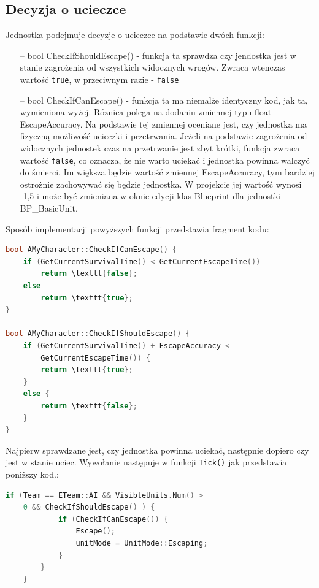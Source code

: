 \documentclass[12pt]{report}
\begin{document}
\subsection{Decyzja o ucieczce}

Jednostka podejmuje decyzje o ucieczce na podstawie dwóch funkcji: 
\begin{itemize}
\item[--] bool CheckIfShouldEscape() - funkcja ta sprawdza czy jendostka jest w stanie zagrożenia od wszystkich widocznych wrogów. Zwraca wtenczas wartość \texttt{true}, w przeciwnym razie - \texttt{false}
\item[--] bool CheckIfCanEscape() - funkcja ta ma niemalże identyczny kod, jak ta, wymieniona wyżej. Róznica polega na dodaniu zmiennej typu float - EscapeAccuracy. Na podstawie tej zmiennej oceniane jest, czy jednostka ma fizyczną możliwość ucieczki i przetrwania. Jeżeli na podstawie zagrożenia od widocznych jednostek czas na przetrwanie jest zbyt krótki, funkcja zwraca wartość \texttt{false}, co oznacza, że nie warto uciekać i jednostka powinna walczyć do śmierci. Im większa będzie wartość zmiennej EscapeAccuracy, tym bardziej ostrożnie zachowywać się będzie jednostka. W projekcie jej wartość wynosi -1,5 i może być zmieniana w oknie edycji klas Blueprint dla jednostki BP\_BasicUnit.
\end{itemize}

Sposób implementacji powyższych funkcji przedstawia fragment kodu:

\begin{lstlisting}[language=C++, backgroundcolor=\color{black!5}, basicstyle=\footnotesize, caption=Funkcje CheckIfShouldEscape i CheckIfCanEscape w klasie \texttt{AMyCharacter.cpp}.]
bool AMyCharacter::CheckIfCanEscape() {
	if (GetCurrentSurvivalTime() < GetCurrentEscapeTime())
		return \texttt{false};
	else
		return \texttt{true};
}

bool AMyCharacter::CheckIfShouldEscape() {
	if (GetCurrentSurvivalTime() + EscapeAccuracy < 
	    GetCurrentEscapeTime()) {
		return \texttt{true};
	}
	else {
		return \texttt{false};
	}
}
\end{lstlisting}

Najpierw sprawdzane jest, czy jednostka powinna uciekać, następnie dopiero czy jest w stanie uciec. Wywołanie następuje w funkcji \texttt{\texttt{Tick}()} jak przedstawia poniższy kod.:

\begin{lstlisting}[language=C++, backgroundcolor=\color{black!5}, basicstyle=\footnotesize, caption=Wywołanie funkcji CheckIfShouldEscape i CheckIfCanEscape w funkcji \texttt{\texttt{Tick}()} klasy AMyCharacter.]
if (Team == ETeam::AI && VisibleUnits.Num() > 
    0 && CheckIfShouldEscape() ) {
			if (CheckIfCanEscape()) {
				Escape();
				unitMode = UnitMode::Escaping;
			}
		}
	}
\end{lstlisting}
\end{document}
